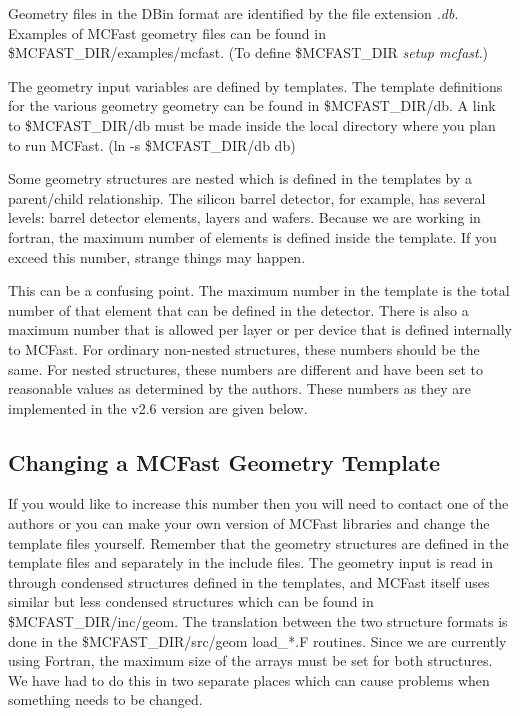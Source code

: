 Geometry files in the DBin format are identified by the file extension {\it .db}.
Examples of MCFast geometry files can be found in \$MCFAST\_DIR/examples/mcfast. 
%
(To define \$MCFAST\_DIR {\it setup mcfast}.)
%


The geometry input variables are defined by templates.  
The template definitions for the various geometry geometry can be found in 
\$MCFAST\_DIR/db.  A link to \$MCFAST\_DIR/db must be made
inside the local directory where
you plan to run MCFast.  (ln -s \$MCFAST\_DIR/db db)  

Some geometry structures are nested which is defined in the
templates by a parent/child relationship.  The silicon barrel detector,
for example, has several levels: barrel detector elements, layers and wafers. 
Because we are working in fortran, the maximum number of elements is defined
inside the template.  If you exceed this number, strange things may happen.

This can be a confusing point.  The maximum number in the template is the 
total number of that element that can be defined in the detector.  There is
also a maximum number that is allowed per layer or per device that is defined 
internally to MCFast.  For ordinary non-nested structures, these numbers should
be the same.  For nested structures, these numbers are different and have been
set to reasonable values as determined by the authors.  These
numbers as they are implemented in the v2.6 version are given below.  

\subsection{Changing a MCFast Geometry Template}

If you would like to increase this number then you will need to contact one
of the authors or you can make your own version of MCFast libraries and 
change the template files yourself.  Remember that the geometry structures
are defined in the template files and separately in the include files.  
The geometry input is read in through condensed structures defined 
in the templates, and MCFast itself uses similar but less condensed
structures which can be found in \$MCFAST\_DIR/inc/geom.  The translation between the two
structure formats is done in the
\$MCFAST\_DIR/src/geom load\_*.F routines.  Since we are currently using Fortran,  
the maximum size of the arrays must be set for both structures.  We
have had to do this in two separate places which can cause problems when
something needs to be changed. 

